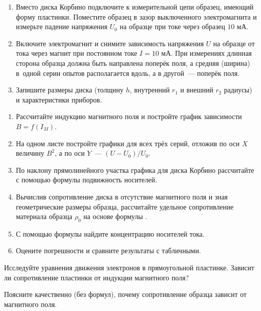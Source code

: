 \begin{lab:task}
\begin{enumerate}
\item{ Вместо диска Корбино подключите к измерительной цепи образец, имеющий форму пластинки. Поместите образец в зазор выключенного электромагнита и измерьте падение напряжения $U_0$ на образце при токе через образец $10$ мА.}

\item{ Включите электромагнит и снимите зависимость напряжения $U$ на образце от тока через магнит при постоянном токе $I=10$ мА. При измерениях длинная сторона образца должна быть направлена поперёк поля, а средняя (ширина) в~одной серии опытов располагается вдоль, а в другой~--- поперёк поля.}

\item{ Запишите размеры диска (толщину $h$, внутренний $r_1$  и внешний $r_2$ радиусы) и характеристики приборов.}
\end{enumerate}

\begin{enumerate}

\item { Рассчитайте индукцию магнитного поля и постройте график зависимости $B=f(I_{M})$.}

\item { На одном листе постройте графики для всех трёх серий, отложив по оси $X$ величину $B^2$, а по оси $Y$~--- $(U-U_0)/U_0$.}

\item { По наклону прямолинейного участка графика для диска Корбино рассчитайте с помощью формулы  подвижность носителей.}

\item { Вычислив сопротивление диска в отсутствие магнитного поля и зная геометрические размеры образца, рассчитайте удельное сопротивление материала образца $\rho_0$ на основе формулы .}

\item {С помощью формулы  найдите концентрацию носителей тока.}

\item { Оцените погрешности и сравните результаты с табличными.}
\end{enumerate}
\end{lab:task}

\begin{lab:questions}

\item{ Исследуйте уравнения движения электронов в прямоугольной пластинке. Зависит ли сопротивление пластинки от индукции магнитного поля?}

\item{ Поясните качественно (без формул), почему сопротивление образца зависит от магнитного поля.}
\end{lab:questions}

